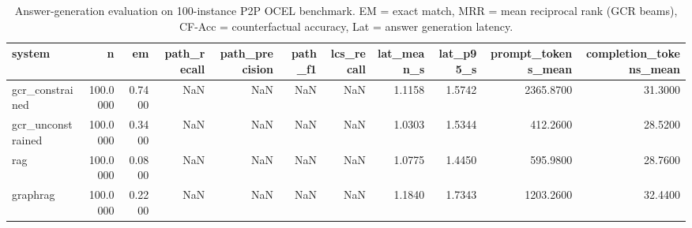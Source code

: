 \begin{table}
\caption{Answer-generation evaluation on 100-instance P2P OCEL benchmark. EM = exact match, MRR = mean reciprocal rank (GCR beams), CF-Acc = counterfactual accuracy, Lat = answer generation latency.}
\label{tab:answer_results}
\begin{tabular}{lrrrrrrrrrr}
\toprule
system & n & em & path_recall & path_precision & path_f1 & lcs_recall & lat_mean_s & lat_p95_s & prompt_tokens_mean & completion_tokens_mean \\
\midrule
gcr_constrained & 100.0000 & 0.7400 & NaN & NaN & NaN & NaN & 1.1158 & 1.5742 & 2365.8700 & 31.3000 \\
gcr_unconstrained & 100.0000 & 0.3400 & NaN & NaN & NaN & NaN & 1.0303 & 1.5344 & 412.2600 & 28.5200 \\
rag & 100.0000 & 0.0800 & NaN & NaN & NaN & NaN & 1.0775 & 1.4450 & 595.9800 & 28.7600 \\
graphrag & 100.0000 & 0.2200 & NaN & NaN & NaN & NaN & 1.1840 & 1.7343 & 1203.2600 & 32.4400 \\
\bottomrule
\end{tabular}
\end{table}
